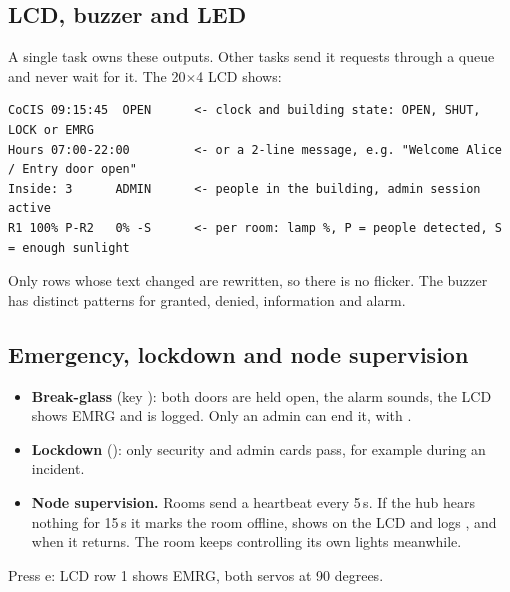 \subsection{LCD, buzzer and LED}
\label{sec:op-ui}
A single  task owns these outputs. Other tasks send it requests through a queue and never
wait for it. The 20$\times$4 LCD shows:
\begin{lstlisting}[style=console]
CoCIS 09:15:45  OPEN      <- clock and building state: OPEN, SHUT, LOCK or EMRG
Hours 07:00-22:00         <- or a 2-line message, e.g. "Welcome Alice / Entry door open"
Inside: 3      ADMIN      <- people in the building, admin session active
R1 100% P-R2   0% -S      <- per room: lamp %, P = people detected, S = enough sunlight
\end{lstlisting}
Only rows whose text changed are rewritten, so there is no flicker. The buzzer has distinct
patterns for granted, denied, information and alarm.

\subsection{Emergency, lockdown and node supervision}
\label{sec:op-emergency}
\begin{itemize}
  \item \textbf{Break-glass} (key ): both doors are held open, the alarm sounds, the LCD
        shows EMRG and  is logged. Only an admin can end it, with
        .
  \item \textbf{Lockdown} (): only security and admin cards pass, for example
        during an incident.
  \item \textbf{Node supervision.} Rooms send a heartbeat every 5\,s. If the hub hears nothing for
        15\,s it marks the room offline, shows  on the LCD and logs
        , and  when it returns. The room keeps
        controlling its own lights meanwhile.
\end{itemize}

  {Press e: LCD row 1 shows EMRG, both servos at 90 degrees.}
